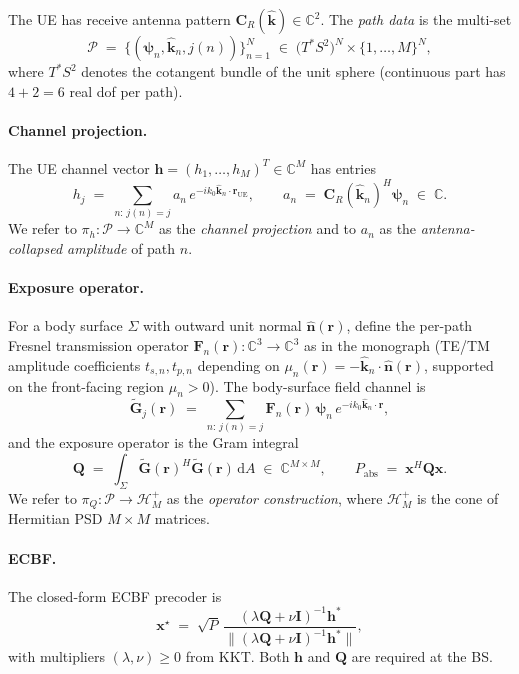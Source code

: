\documentclass[11pt,a4paper]{article}
\theoremstyle{definition}
\newcommand{\rr}{\mathbf{r}}
\newcommand{\xx}{\mathbf{x}}
\newcommand{\hh}{\mathbf{h}}
\newcommand{\nh}{\hat{\mathbf{n}}}
\newcommand{\kh}{\hat{\mathbf{k}}}
\newcommand{\Q}{\mathbf{Q}}
\newcommand{\Gt}{\tilde{\mathbf{G}}}
\newcommand{\F}{\mathbf{F}}
\newcommand{\Cp}{\mathbf{C}}
\newcommand{\psib}{\boldsymbol{\psi}}
\newcommand{\Sigmaset}{\Sigma}
\newcommand{\C}{\mathbb{C}}
\newcommand{\diff}{\mathrm{d}}
\begin{document}
The UE has receive antenna pattern $\Cp_R(\kh)\in\C^2$. The
\emph{path data} is the multi-set
\[
  \mathcal{P} \;=\; \bigl\{(\psib_n,\kh_n,j(n))\bigr\}_{n=1}^N
  \;\in\;\bigl(T^*S^2\bigr)^N \times \{1,\dots,M\}^N,
\]
where $T^*S^2$ denotes the cotangent bundle of the unit sphere
(continuous part has $4+2=6$ real dof per path).

\paragraph{Channel projection.}
The UE channel vector
$\hh = (h_1,\dots,h_M)^T \in \C^M$ has entries
\begin{equation}
  h_j \;=\; \sum_{n:\,j(n)=j}
            a_n \, e^{-ik_0 \kh_n \cdot \rr_{\mathrm{UE}}},
  \qquad
  a_n \;=\; \Cp_R(\kh_n)^H \psib_n \;\in\;\C.
  \label{eq:h-def}
\end{equation}
We refer to $\pi_h:\mathcal{P}\to\C^M$ as the
\emph{channel projection} and to $a_n$ as the \emph{antenna-collapsed
amplitude} of path $n$.

\paragraph{Exposure operator.}
For a body surface $\Sigmaset$ with outward unit normal $\nh(\rr)$, define
the per-path Fresnel transmission operator
$\F_n(\rr): \C^3 \to \C^3$ as in
the monograph (TE/TM amplitude coefficients $t_{s,n}, t_{p,n}$ depending on
$\mu_n(\rr) = -\kh_n\cdot\nh(\rr)$, supported on the front-facing region
$\mu_n>0$). The body-surface field channel is
\begin{equation}
  \Gt_j(\rr) \;=\; \sum_{n:\,j(n)=j}
                   \F_n(\rr)\,\psib_n\,e^{-ik_0\kh_n\cdot\rr},
\end{equation}
and the exposure operator is the Gram integral
\begin{equation}
  \Q \;=\; \int_{\Sigmaset} \Gt(\rr)^H \Gt(\rr)\,\diff A
       \;\in\;\C^{M\times M}, \qquad
  P_{\mathrm{abs}} \;=\; \xx^H \Q \xx.
  \label{eq:Q-def}
\end{equation}
We refer to $\pi_Q:\mathcal{P}\to\mathcal{H}_M^+$ as the
\emph{operator construction}, where $\mathcal{H}_M^+$ is the cone of
Hermitian PSD $M\times M$ matrices.

\paragraph{ECBF.}
The closed-form ECBF precoder is
\begin{equation}
  \xx^\star \;=\; \sqrt{P}\,
                  \frac{(\lambda\Q + \nu \mathbf{I})^{-1}\hh^*}
                       {\|(\lambda\Q + \nu \mathbf{I})^{-1}\hh^*\|},
  \label{eq:ecbf}
\end{equation}
with multipliers $(\lambda,\nu)\ge 0$ from KKT. Both $\hh$ and $\Q$
are required at the BS.
\end{document}
